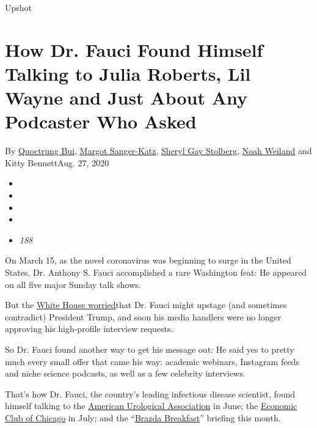 Upshot

\hypertarget{how-dr-fauci-found-himself-talking-to-julia-roberts-lil-wayne-and-just-about-any-podcaster-who-asked}{%
\section{How Dr. Fauci Found Himself Talking to Julia Roberts, Lil Wayne
and Just About Any Podcaster Who
Asked}\label{how-dr-fauci-found-himself-talking-to-julia-roberts-lil-wayne-and-just-about-any-podcaster-who-asked}}

By \href{https://www.nytimes3xbfgragh.onion/by/quoctrung-bui}{Quoctrung
Bui},
\href{https://www.nytimes3xbfgragh.onion/by/margot-sanger-katz}{Margot
Sanger-Katz},
\href{https://www.nytimes3xbfgragh.onion/by/sheryl-gay-stolberg}{Sheryl
Gay Stolberg},
\href{https://www.nytimes3xbfgragh.onion/by/noah-weiland}{Noah Weiland}
and Kitty BennettAug. 27, 2020

\begin{itemize}
\item
\item
\item
\item
\item
  \emph{188}
\end{itemize}

On March 15, as the novel coronavirus was beginning to surge in the
United States, Dr. Anthony S. Fauci accomplished a rare Washington feat:
He appeared on all five major Sunday talk shows.

But the
\href{https://www.nytimes3xbfgragh.onion/2020/03/23/us/politics/coronavirus-trump-fauci.html}{White
House worried}that Dr. Fauci might upstage (and sometimes contradict)
President Trump, and soon his media handlers were no longer approving
his high-profile interview requests.

So Dr. Fauci found another way to get his message out: He said yes to
pretty much every small offer that came his way: academic webinars,
Instagram feeds and niche science podcasts, as well as a few celebrity
interviews.

That's how Dr. Fauci, the country's leading infectious disease
scientist, found himself talking to the
\href{http://auanet.mediaroom.com/2020-06-11-Anthony-S-Fauci-MD-to-Deliver-Keynote-Address-During-the-2020-American-Urological-Association-Virtual-Experience}{A}\href{http://auanet.mediaroom.com/2020-06-11-Anthony-S-Fauci-MD-to-Deliver-Keynote-Address-During-the-2020-American-Urological-Association-Virtual-Experience}{merican
Urological Association} in June; the
\href{https://www.youtube.com/watch?v=ybZjaINKZ-8}{Economic Club of
Chicago} in July; and the
``\href{https://www.youtube.com/watch?v=mnEe4hdE7yE}{Brazda Breakfast}''
briefing this month.

